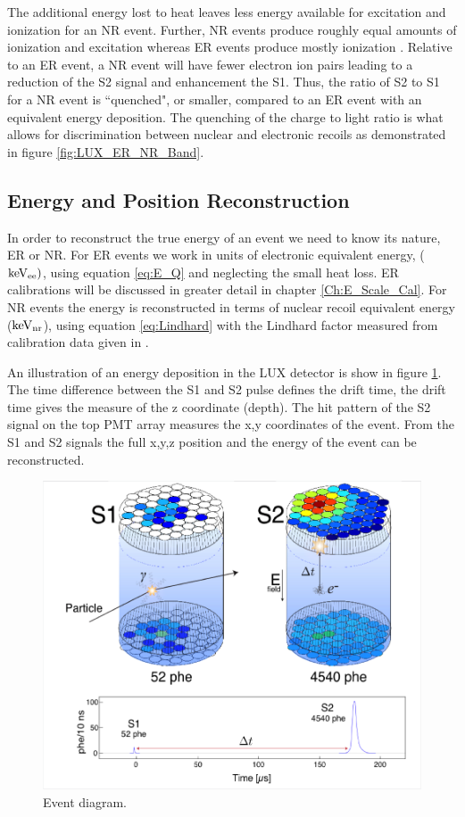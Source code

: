 \noindent The additional energy lost to heat leaves less energy available for excitation and ionization for an NR event. Further, NR events produce roughly equal amounts of ionization and excitation whereas ER events produce mostly ionization \cite{FanoTheoretical}  \cite{Dahl_Thesis}. Relative to an ER event, a NR event will have fewer electron ion pairs leading to a reduction of the S2 signal and enhancement the S1. Thus, the ratio of S2 to S1 for a NR event is ``quenched", or smaller, compared to an ER event with an equivalent energy deposition. The quenching of the charge to light ratio is what allows for discrimination between nuclear and electronic recoils as demonstrated in figure \ref{fig:LUX_ER_NR_Band}.

\subsection{Energy and Position Reconstruction}
In order to reconstruct the true energy of an event we need to know its nature, ER or NR. For ER events we work in units of electronic equivalent energy, ($\rm keV_{ee})$, using equation \ref{eq:E_Q} and neglecting the small heat loss. ER calibrations will be discussed in greater detail in chapter \ref{Ch:E_Scale_Cal}. For NR events the energy is reconstructed in terms of nuclear recoil equivalent energy ($\rm keV_{nr}$), using equation \ref{eq:Lindhard} with the Lindhard factor measured from calibration data given in \cite{NEST} \cite{NEST_2013}.  

An illustration of an energy deposition in the LUX detector is show in figure \ref{fig:LUX_Event}. The time difference between the S1 and S2 pulse defines the drift time, the drift time gives the measure of the z coordinate (depth). The hit pattern of the S2 signal on the top PMT array measures the x,y coordinates of the event. From the S1 and S2 signals the full x,y,z position and the energy of the event can be reconstructed.

 \begin{figure}[h!]\centering
\includegraphics[width=150mm]{Chapter_LUX_Det/LUX_Event_Diagram.png}
\caption{Event diagram.}
\label{fig:LUX_Event}
\end{figure}

